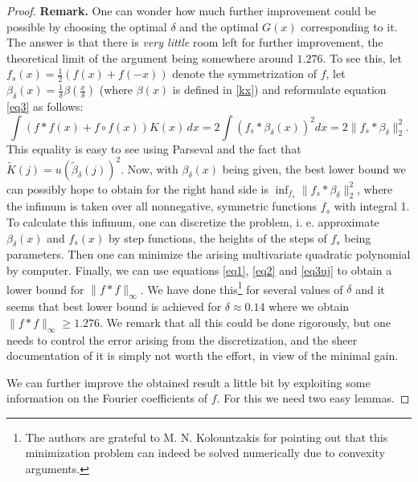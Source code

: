 \documentclass[12pt]{amsart}
\theoremstyle{definition}
\begin{document}
\begin{proof}
{\bf Remark.} One can wonder how much further improvement could be
possible by choosing the optimal $\delta$ and the optimal $G(x)$
corresponding to it. The answer is that there is {\it very little}
room left for further improvement, the theoretical limit of the
argument being somewhere around $1.276$. To see this, let
$f_s(x)=\frac{1}{2}(f(x)+f(-x))$ denote the symmetrization of $f$,
let $\beta_{\delta}(x)=\frac{1}{\delta}\beta(\frac{x}{\delta})$
(where $\beta(x)$ is defined in \eqref{kx})  and reformulate
equation \eqref{eq3} as follows:
\begin{equation}\label{eq3uj}\int (f\ast f (x)+ f\circ f(x)) K(x) \, dx
= 2 \int (f_s \ast \beta_{\delta}(x))^2 dx = 2 \|f_s\ast
\beta_{\delta}\|_2^2.
\end{equation}
This equality is easy to see using Parseval and the fact that
$\tilde K(j)= u (\tilde \beta_{\delta}(j))^2$. Now, with
$\beta_{\delta}(x)$ being given, the best lower bound we can
possibly hope to obtain for the right hand side is $\inf_{f_s}
\|f_s\ast \beta_{\delta}\|_2^2$, where the infimum is taken over
all nonnegative, symmetric functions $f_s$ with integral 1. To
calculate this infimum, one can discretize the problem, i. e.
approximate $\beta_{\delta}(x)$ and $f_s(x)$ by step functions,
the heights of the steps of $f_s$ being parameters. Then one can
minimize the arising multivariate quadratic polynomial by
computer. Finally, we can use equations \eqref{eq1}, \eqref{eq2}
and \eqref{eq3uj} to obtain a lower bound for $\|f\ast
f\|_\infty$. We have done this\footnote{The authors are grateful
to M. N. Kolountzakis for pointing out that this minimization
problem can indeed be solved numerically due to convexity
arguments.} for several values of $\delta$ and it seems that best
lower bound is achieved for $\delta \approx 0.14$ where we obtain
$\|f\ast f\|_\infty \ge 1.276$. We remark that all this could be
done rigorously, but one needs to control the error arising from
the discretization, and the sheer documentation of it is simply
not worth the effort, in view of the minimal gain.

\bigskip

We can further improve the obtained result a little bit by
exploiting some information on the Fourier coefficients of $f$.
For this we need two easy lemmas.


\end{proof}
\end{document}
